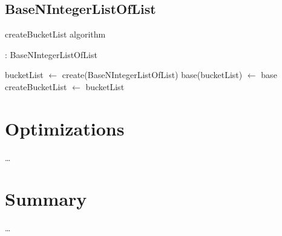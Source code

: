 \documentclass[book, nodocumentinfo]{upmethodology-document}
\begin{document}
\section{BaseNIntegerListOfList}

\begin{algorithm}[H]
	\label{algo:basenintegerlistoflist-create-bucket-list}
	\caption{createBucketList algorithm}
	
	\begin{algorithmic}
		 : BaseNIntegerListOfList
		
		\State bucketList \(\leftarrow \) create(BaseNIntegerListOfList)
		\State base(bucketList) \(\leftarrow \) base
		\State createBucketList \(\leftarrow \) bucketList

		\EndFunction
	\end{algorithmic}
\end{algorithm}

\chapter{Optimizations}

…

\chapter{Summary}

…



{}
\end{document}
